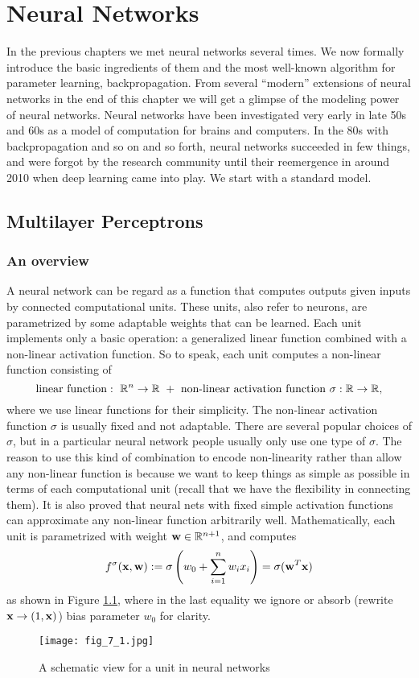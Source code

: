 \documentclass[../book-template.tex]{subfiles}
\begin{document}
\chapter{Neural Networks}
In the previous chapters we met neural networks several times. We now formally introduce the basic ingredients of them and the most well-known algorithm for parameter learning, backpropagation. From several ``modern'' extensions of neural networks in the end of this chapter we will get a glimpse of the modeling power of neural networks. Neural networks have been investigated very early in late 50s and 60s as a model of computation for brains and computers. In the 80s with backpropagation and so on and so forth, neural networks succeeded in few things, and were forgot by the research community until their reemergence in around 2010 when deep learning came into play. We start with a standard model.

\section{Multilayer Perceptrons}
\subsection{An overview}
A neural network can be regard as a function that computes outputs given inputs by connected computational units. These units, also refer to neurons, are parametrized by some adaptable weights that can be learned. Each unit implements only a basic operation: a generalized linear function combined with a non-linear activation function. So to speak, each unit computes a non-linear function consisting of
\begin{equation*}
	{\rm linear\ function}:\ \mathbb{R}^n\rightarrow \mathbb{R}\ +\ \text{non-linear activation function}\ \sigma:\mathbb{R}\rightarrow \mathbb{R},
\end{equation*}
where we use linear functions for their simplicity. The non-linear activation function $\sigma$ is usually fixed and not adaptable. There are several popular choices of $\sigma$, but in a particular neural network people usually only use one type of $\sigma$. The reason to use this kind of combination to encode non-linearity rather than allow any non-linear function is because we want to keep things as simple as possible in terms of each computational unit (recall that we have the flexibility in connecting them). It is also proved that neural nets with fixed simple activation functions can approximate any non-linear function arbitrarily well. Mathematically, each unit is parametrized with weight ${\bf w}\in \mathbb{R}^{n+1}$, and computes
\begin{equation*}
	f^{\sigma}({\bf x},{\bf w}):=\sigma\left(w_0+\sum_{i=1}^{n}w_ix_i\right)=\sigma({\bf w}^T{\bf x})
\end{equation*}
as shown in Figure \ref{fig_7_1}, where in the last equality we ignore or absorb (rewrite ${\bf x}\rightarrow (1,{\bf x})$) bias parameter $w_0$ for clarity.
\begin{figure}[h] 
	\centering 
	\texttt{[image: fig\_7\_1.jpg]} 
	\caption{A schematic view for a unit in neural networks}\label{fig_7_1}
\end{figure}
\end{document}
